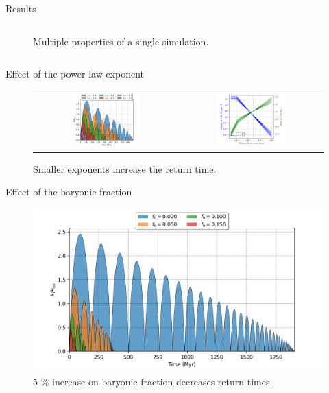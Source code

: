 \documentclass{beamer}
\begin{document}
\begin{frame}{Results}
\begin{columns}
\begin{column}{0.7\linewidth}
\begin{figure}[h]
				\caption{Multiple properties of a single simulation.}
			\end{figure}
		\end{column}
	\end{columns}
\end{frame}

\begin{frame}{Effect of the power law exponent}
	\begin{figure}[h]
		\centering
		\begin{tabular}{cc}
			\includegraphics[width = 0.5\textwidth]{"../Files/Week 6/power_law"} & \includegraphics[width = 0.5\textwidth]{"../Files/Week 6/power_law_density"}
		\end{tabular}
		\caption{Smaller exponents increase the return time.}
	\end{figure}
\end{frame}

\begin{frame}{Effect of the baryonic fraction}
	\begin{figure}[h]
		\centering
		\includegraphics[height=0.7\textheight]{"../Files/Week 5/baryonic_fraction_comparison"}
		\caption{5 \% increase on baryonic fraction decreases return times.}
	\end{figure}
\end{frame}
\end{document}
